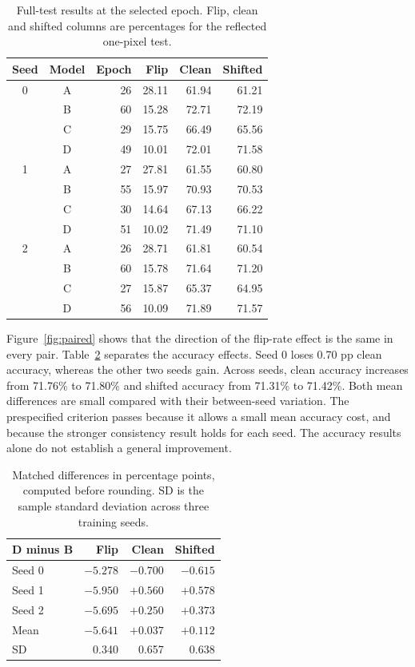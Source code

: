 \documentclass[conference]{IEEEtran}
\begin{document}
\begin{table}[!ht]
\centering
\caption{Full-test results at the selected epoch. Flip, clean and shifted columns are percentages for the reflected one-pixel test.}
\label{tab:raw}
\begin{tabular}{ccrrrr}\toprule
Seed & Model & Epoch & Flip & Clean & Shifted\\\midrule
0&A&26&28.11&61.94&61.21\\
 &B&60&15.28&72.71&72.19\\
 &C&29&15.75&66.49&65.56\\
 &D&49&10.01&72.01&71.58\\\midrule
1&A&27&27.81&61.55&60.80\\
 &B&55&15.97&70.93&70.53\\
 &C&30&14.64&67.13&66.22\\
 &D&51&10.02&71.49&71.10\\\midrule
2&A&26&28.71&61.81&60.54\\
 &B&60&15.78&71.64&71.20\\
 &C&27&15.87&65.37&64.95\\
 &D&56&10.09&71.89&71.57\\\bottomrule
\end{tabular}
\end{table}

Figure~\ref{fig:paired} shows that the direction of the flip-rate effect is the same in every pair. Table~\ref{tab:paired} separates the accuracy effects. Seed 0 loses 0.70 pp clean accuracy, whereas the other two seeds gain. Across seeds, clean accuracy increases from 71.76\% to 71.80\% and shifted accuracy from 71.31\% to 71.42\%. Both mean differences are small compared with their between-seed variation. The prespecified criterion passes because it allows a small mean accuracy cost, and because the stronger consistency result holds for each seed. The accuracy results alone do not establish a general improvement.

\begin{table}[!ht]
\centering\caption{Matched differences in percentage points, computed before rounding. SD is the sample standard deviation across three training seeds.}
\label{tab:paired}
\begin{tabular}{lrrr}\toprule
D minus B & Flip & Clean & Shifted\\\midrule
Seed 0 & $-5.278$ & $-0.700$ & $-0.615$\\
Seed 1 & $-5.950$ & $+0.560$ & $+0.578$\\
Seed 2 & $-5.695$ & $+0.250$ & $+0.373$\\
Mean & $-5.641$ & $+0.037$ & $+0.112$\\
SD & 0.340 & 0.657 & 0.638\\\bottomrule
\end{tabular}
\end{table}
\end{document}
